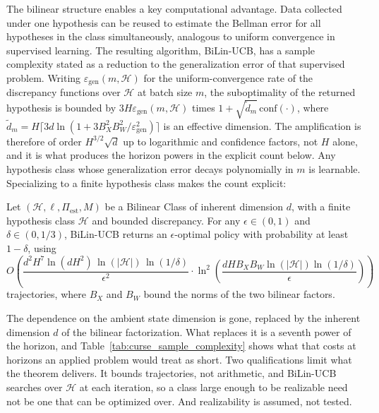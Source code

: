 The bilinear structure enables a key computational advantage. Data collected under one hypothesis can be reused to estimate the Bellman error for all hypotheses in the class simultaneously, analogous to uniform convergence in supervised learning. The resulting algorithm, BiLin-UCB, has a sample complexity stated as a reduction to the generalization error of that supervised problem. Writing $\varepsilon_{\text{gen}}(m, \mathcal{H})$ for the uniform-convergence rate of the discrepancy functions over $\mathcal{H}$ at batch size $m$, the suboptimality of the returned hypothesis is bounded by $3H \varepsilon_{\text{gen}}(m, \mathcal{H})$ times $1 + \sqrt{\tilde{d}_m}\,\mathrm{conf}(\cdot)$, where $\tilde{d}_m = H \lceil 3d \ln(1 + 3B_X^2 B_W^2 / \varepsilon_{\text{gen}}^2) \rceil$ is an effective dimension. The amplification is therefore of order $H^{3/2}\sqrt{d}$ up to logarithmic and confidence factors, not $H$ alone, and it is what produces the horizon powers in the explicit count below. Any hypothesis class whose generalization error decays polynomially in $m$ is learnable. Specializing to a finite hypothesis class makes the count explicit:

\begin{theorem}[Du et al. 2021, Corollary 5.1]
\label{thm:bilinear_sample}
Let $(\mathcal{H}, \ell, \Pi_{\text{est}}, M)$ be a Bilinear Class of inherent dimension $d$, with a finite hypothesis class $\mathcal{H}$ and bounded discrepancy. For any $\epsilon \in (0,1)$ and $\delta \in (0, 1/3)$, BiLin-UCB returns an $\epsilon$-optimal policy with probability at least $1 - \delta$, using
\begin{equation}
O\left( \frac{d^2 H^7 \ln(d H^2)\, \ln(|\mathcal{H}|)\, \ln(1/\delta)}{\epsilon^2} \cdot \ln^2\!\left( \frac{d H B_X B_W \ln(|\mathcal{H}|) \ln(1/\delta)}{\epsilon} \right) \right)
\label{eq:bilin_samples}
\end{equation}
trajectories, where $B_X$ and $B_W$ bound the norms of the two bilinear factors.
\end{theorem}

The dependence on the ambient state dimension is gone, replaced by the inherent dimension $d$ of the bilinear factorization. What replaces it is a seventh power of the horizon, and Table~\ref{tab:curse_sample_complexity} shows what that costs at horizons an applied problem would treat as short. Two qualifications limit what the theorem delivers. It bounds trajectories, not arithmetic, and BiLin-UCB searches over $\mathcal{H}$ at each iteration, so a class large enough to be realizable need not be one that can be optimized over. And realizability is assumed, not tested.

